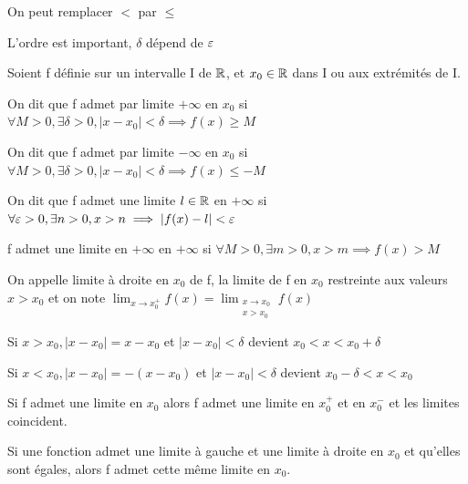 \documentclass[a4paper, 12pt]{article}
\begin{document}
\begin{remark}
    \item On peut remplacer $\lt$ par $\leq$
    \item L'ordre est important, $\delta$ dépend de $\varepsilon$
\end{remark}

\begin{definition}
    Soient f définie sur un intervalle I de $\mathbb{R}$, et $x_0 \in \mathbb{R}$ dans I ou aux extrémités de I.

    \item On dit que f admet par limite $+\infty$ en $x_0$ si $\forall M \gt 0, \exists \delta \gt 0, |x - x_0| \lt \delta \implies f(x) \geq M$
    \item On dit que f admet par limite $-\infty$ en $x_0$ si $\forall M \gt 0, \exists \delta \gt 0, |x - x_0| \lt \delta \implies f(x) \leq -M$
\end{definition}

\begin{definition}
    On dit que f admet une limite $l \in \mathbb{R}$ en $+\infty$ si $\forall \varepsilon > 0, \exists n > 0, x > n \implies |f(x) - l| < \varepsilon$
\end{definition}

\begin{definition}
    f admet une limite en $+\infty$ en $+\infty$ si $\forall M \gt 0, \exists m \gt 0, x \gt m \implies f(x) \gt M$
\end{definition}


\begin{definition}
    On appelle limite à droite en $x_0$ de f, la limite de f en $x_0$ restreinte aux valeurs $x \gt x_0$ et on note
    $\lim_{x \to x_0^+} f(x) = \lim_{\substack{x \to x_0 \\ x \gt x_0}}f(x)$
\end{definition}

\begin{remark}
    \item Si $x \gt x_0, |x - x_0| = x-x_0$ et $|x - x_0| \lt \delta$ devient $x_0 \lt x \lt x_0 + \delta$
    \item Si $x \lt x_0, |x - x_0| = -(x-x_0)$ et $|x - x_0| \lt \delta$ devient $x_0-\delta \lt x \lt x_0$
\end{remark}

\begin{proposition}
    \item Si f admet une limite en $x_0$ alors f admet une limite en $x_0^+$ et en $x_0^-$ et les limites coincident.
    \item Si une fonction admet une limite à gauche et une limite à droite en $x_0$ et qu'elles sont égales, alors f admet cette même limite en $x_0$.
\end{proposition}
\end{document}
